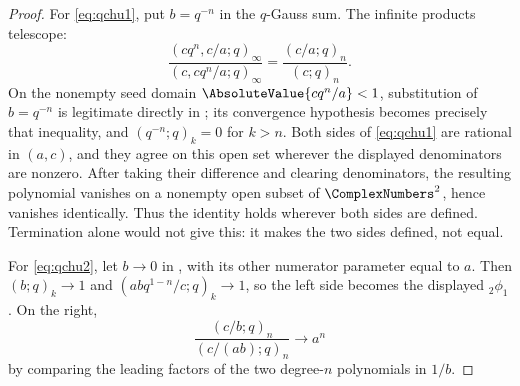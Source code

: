 \documentclass[11pt,a4paper,oneside,openany]{book}
\theoremstyle{definition}
\theoremstyle{remark}
\begin{document}
\begin{proof}
For \eqref{eq:qchu1}, put $b=q^{-n}$ in the $q$-Gauss sum.  The infinite products telescope:
\[
 \frac{(cq^n,c/a;q)_\infty}{(c,cq^n/a;q)_\infty}
 =\frac{(c/a;q)_n}{(c;q)_n}.
\]
On the nonempty seed domain $\AbsoluteValue{cq^n/a}<1$, substitution of
$b=q^{-n}$ is legitimate directly in ; its convergence
hypothesis becomes precisely that inequality, and
$(q^{-n};q)_k=0$ for $k>n$.  Both sides of \eqref{eq:qchu1} are rational in
$(a,c)$, and they agree on this open set wherever the displayed denominators
are nonzero.  After taking their difference and clearing denominators, the
resulting polynomial vanishes on a nonempty open subset of
$\ComplexNumbers^2$, hence vanishes identically.  Thus the identity holds
wherever both sides are defined.  Termination alone would not give this: it
makes the two sides defined, not equal.

For \eqref{eq:qchu2}, let $b\to0$ in , with its other numerator parameter equal to $a$.  Then $(b;q)_k\to1$ and $(abq^{1-n}/c;q)_k\to1$, so the left side becomes the displayed ${}_2\phi_1$.  On the right,
\[
 \frac{(c/b;q)_n}{(c/(ab);q)_n}\longrightarrow a^n
\]
by comparing the leading factors of the two degree-$n$ polynomials in $1/b$.
\end{proof}

\end{document}
